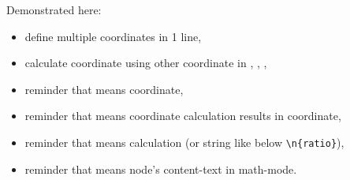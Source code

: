 \documentclass[lualatex]{jlreq}
\begin{document}
Demonstrated here:
\begin{itemize}
    \item define multiple coordinates in 1 line,
    \item calculate coordinate using other coordinate in , , , %
    \item reminder that \lstinlineiv{()} means coordinate,
    \item reminder that \lstinlineiv{($ $)} means coordinate calculation results in coordinate, %
    \item reminder that \lstinlineiv{{}} means calculation (or string like below \verb|\n{ratio}|),
    \item reminder that \lstinlineiv{{$ $}} means node's content-text in math-mode. %
\end{itemize}
\end{document}

